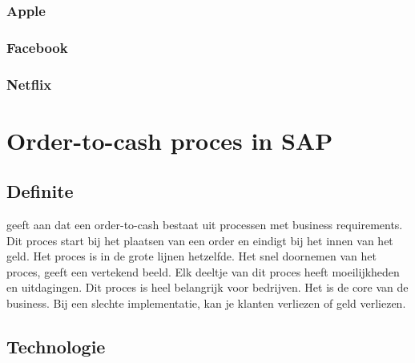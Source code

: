 \subsubsection{Apple}
\subsubsection{Facebook}
\subsubsection{Netflix}

\section{Order-to-cash proces in SAP}
\subsection{Definite}
\textcite{Obrien2017} geeft aan dat een order-to-cash bestaat uit processen met business requirements. Dit proces start bij het plaatsen van een order en eindigt bij het innen van het geld. Het proces is in de grote lijnen hetzelfde. Het snel doornemen van het proces, geeft een vertekend beeld. Elk deeltje van dit proces heeft moeilijkheden en uitdagingen. 
Dit proces is heel belangrijk voor bedrijven. Het is de core van de business. Bij een slechte implementatie, kan je klanten verliezen of geld verliezen. 
\subsection{Technologie}
